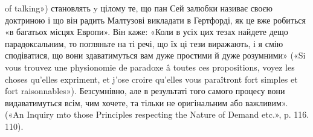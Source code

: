 of talking») становлять y цілому те, що пан Сей залюбки називає своєю
доктриною і що він радить Малтузові викладати в Гертфорді, як це вже
робиться «в багатьох місцях Европи». Він каже: «Коли в усіх цих тезах
найдете дещо парадоксальним, то погляньте на ті речі, що їх ці тези виражають,
і я смію сподіватися, що вони здаватимуться вам дуже простими
й дуже розумними» («Si vous trouvez une physionomie de paradoxe â
toutes ces propositions, voyez les choses qu’elles expriment, et j’ose croire
qu’elles vous paraîtront fort simples et fort raisonnables»). Безсумнівно,
але в результаті того самого процесу вони видаватимуться всім, чим хочете,
та тільки не оригінальним або важливим». («An Inquiry mto those
Principles respecting the Nature of Demand etc.», p. 116. 110).
\parbreak{}  %
